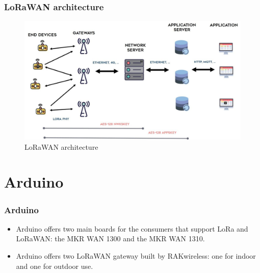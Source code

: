 \documentclass{beamer}
\begin{document}
\begin{frame}
    \frametitle{LoRaWAN architecture}
    \begin{figure}
        \centering
        \includegraphics[width=\textwidth]{images/lorawan-architecture.jpg}
        \caption{LoRaWAN architecture}
    \end{figure}
\end{frame}

\section{Arduino}
\begin{frame}
    \frametitle{Arduino}
    \begin{itemize}[<+->]
        \item Arduino offers two main boards for the consumers that support LoRa and
              LoRaWAN\@: the MKR WAN 1300 and the MKR WAN 1310.
        \item Arduino offers two LoRaWAN gateway built by RAKwireless: one for indoor and one
              for outdoor use.
    \end{itemize}
\end{frame}
\end{document}
